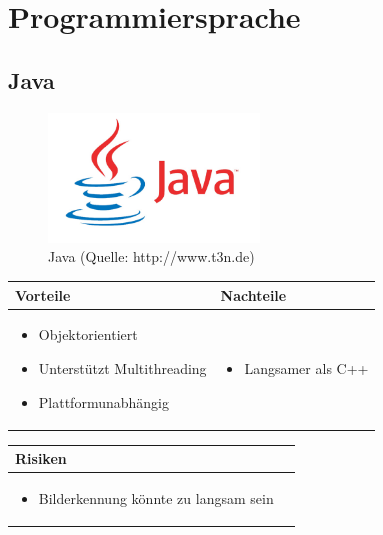 
\section{Programmiersprache}


\subsection{Java}

\begin{figure}[h!]%
\centering
\includegraphics[width=0.5\textwidth]{fig/java.jpeg}
\caption{Java (Quelle: http://www.t3n.de)}
\label{fig:Java}
\end{figure}

\begin{table}[h]
\begin{tabular}{p{} | p{}}


 \textbf{Vorteile} & \textbf{Nachteile} \\ \hline
	 
\begin{itemize}
\item Objektorientiert
\item Unterstützt Multithreading
\item Plattformunabhängig
\end{itemize}

 
 &
 
\begin{itemize}
\item Langsamer als C++
\end{itemize}

\end{tabular}
\end{table}

\begin{table}[h]
\begin{tabular}{p{}p{}}


 \textbf{Risiken} & \\ \hline
	 
\begin{itemize}
\item Bilderkennung könnte zu langsam sein
\end{itemize}

 
\end{tabular}
\end{table}

